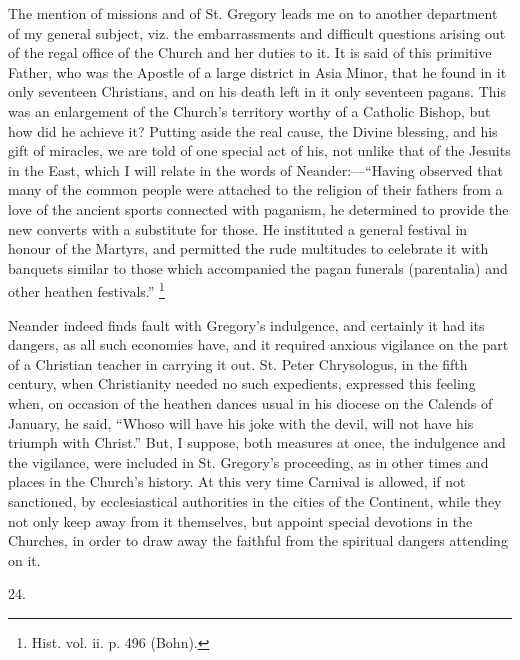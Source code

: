 The mention of missions and of St. Gregory leads me on to another
department of my general subject, viz. the embarrassments and
difficult questions arising out of the regal office of the Church and
her duties to it. It is said of this primitive Father, who was the
Apostle of a large district in Asia Minor, that he found in it only
seventeen Christians, and on his death left in it only seventeen
pagans. This was an enlargement of the Church's territory worthy of a
Catholic Bishop, but how did he achieve it? Putting aside the real
cause, the Divine blessing, and his gift of miracles, we are told of
one special act of his, not unlike that of the Jesuits in
the East, which I will relate in the words of Neander:—``Having
observed that many of the common people were attached to the religion
of their fathers from a love of the ancient sports connected with
paganism, he determined to provide the new converts with a substitute
for those. He instituted a general festival in honour of the Martyrs,
and permitted the rude multitudes to celebrate it with banquets
similar to those which accompanied the pagan funerals (parentalia) and
other heathen festivals.'' \footnote{Hist. vol. ii. p. 496 (Bohn).}

Neander indeed finds fault with Gregory's indulgence, and certainly
it had its dangers, as all such economies have, and it required
anxious vigilance on the part of a Christian teacher in carrying it
out. St. Peter Chrysologus, in the fifth century, when Christianity
needed no such expedients, expressed this feeling when, on occasion of
the heathen dances usual in his diocese on the Calends of January, he
said, ``Whoso will have his joke with the devil, will not have his
triumph with Christ.'' But, I suppose, both measures at once, the
indulgence and the vigilance, were included in St. Gregory's
proceeding, as in other times and places in the Church's history. At
this very time Carnival is allowed, if not sanctioned, by
ecclesiastical authorities in the cities of the Continent, while they
not only keep away from it themselves, but appoint special
devotions in the Churches, in order to draw away the faithful from the
spiritual dangers attending on it.

24.

